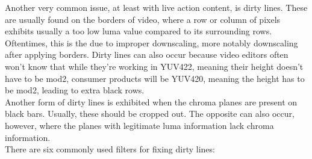 \documentclass{scrartcl}
\begin{document}
Another very common issue, at least with live action content, is dirty lines.  These are usually found on the borders of video, where a row or column of pixels exhibits usually a too low luma value compared to its surrounding rows.  Oftentimes, this is the due to improper downscaling, more notably downscaling after applying borders.  Dirty lines can also occur because video editors often won't know that while they're working in YUV422, meaning their height doesn't have to be mod2, consumer products will be YUV420, meaning the height has to be mod2, leading to extra black rows. \\
Another form of dirty lines is exhibited when the chroma planes are present on black bars.  Usually, these should be cropped out.  The opposite can also occur, however, where the planes with legitimate luma information lack chroma information.\\
There are six commonly used filters for fixing dirty lines:
\end{document}

